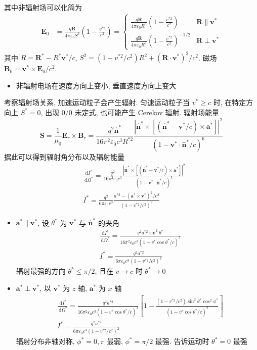\documentclass[12pt,a4paper]{article}%
\numberwithin{equation}{section}%
\renewcommand*{\vec}[1]{\bm{#1}}%
\newcommand{\dif}{\,\mathrm d}
\newcommand*{\uvec}[1]{\hat{\vec{#1}}}
\begin{document}
其中非辐射场可以化简为
\begin{align}
    \vec E_0 &= \frac{q\vec R}{4\pi\varepsilon_0 S^3}\left(1-\frac{v^{*2}}{c^2}\right)
     =\begin{cases}
         \frac{q\vec R}{4\pi\varepsilon_0 R^3}\left(1-\frac{v^{*2}}{c^2}\right) & \vec R \parallel \vec v^* \\
         \frac{q\vec R}{4\pi\varepsilon_0 R^3}\left(1-\frac{v^{*2}}{c^2}\right)^{-1/2} & \vec R \perp \vec v^*
     \end{cases}
\end{align}
其中 $R = \vec R^* - R^*\vec v^*/c$, $S^2 = (1-v^{*2}/c^2)R^2 + (\vec R\cdot\vec v^*)^2/c^2$. 磁场 $\vec B_0 = \vec v^* \times \vec E_0/c^2$.
\begin{itemize}
    \item 非辐射电场在速度方向上变小, 垂直速度方向上变大
\end{itemize}

考察辐射场关系, 加速运动粒子会产生辐射. 匀速运动粒子当 $v^*\ge c$ 时, 在特定方向上 $S^* = 0$, 出现 $0/0$ 未定式, 也可能产生 Cerekov 辐射. 辐射场能量
\begin{equation}
    \vec S = \frac 1{\mu_0}\vec E_r \times\vec B_r 
    = \frac{q^2\uvec n^*}{16\pi^2\varepsilon_0c^3R^{*2}}
    \frac{|\uvec n^*\times[(\uvec n^* - \vec v^*/c)\times\vec a^*]|^2}{(1-\vec v^*\cdot\uvec n^*/c)^6}
\end{equation}
据此可以得到辐射角分布以及辐射能量
\begin{align}
    &\frac{\dif I^*}{\dif\Omega^*} = \frac{q^2}{16\pi^2\varepsilon_0 c^3}\frac{|\uvec n^*\times[(\uvec n^* - \vec v^*/c)\times\vec a^*]|^2}{(1-\vec v^*\cdot\uvec n^*/c)^5} \\
    &I^* = \frac{q^2}{6\pi\varepsilon_0 c^3}\frac{a^{*2} - (\vec a^{*}\times\vec v^{*})^2/c^2}{(1-v^{*2}/c^2)^3}
\end{align}
\begin{itemize}
    \item $\vec a^*\parallel\vec v^*$, 设 $\theta^*$ 为 $\vec v^* $ 与 $\uvec n^*$ 的夹角
    \begin{align}
        &\frac{\dif I^*}{\dif\Omega^*} = \frac{q^2 a^{*2}\sin^2\theta^*}{16\pi^2\varepsilon_0 c^3(1-v^*\cos\theta^*/c)^5} \\
        &I^* = \frac{q^2a^{*2}}{6\pi\varepsilon_0 c^3(1-v^{*2}/c^2)^3}
    \end{align}
    辐射最强的方向 $\theta^* \le \pi/2$, 且在 $v\to c$ 时 $\theta^*\to 0$
    \item $\vec a^*\perp\vec v^*$, 以 $\vec v^*$ 为 $z$ 轴, $\vec a^*$ 为 $x$ 轴
    \begin{align}
        &\frac{\dif I^*}{\dif\Omega^*} = \frac{q^2 a^{*2}}{16\pi^2\varepsilon_0 c^3(1-v^*\cos\theta^*/c)^3}\left[1-
        \frac{(1-v^{*2}/c^2)\sin^2\theta^*\cos^2\phi^*}{(1-v^*\cos\theta^*/c)^2}\right] \\
        &I^* = \frac{q^2a^{*2}}{6\pi\varepsilon_0 c^3(1-v^{*2}/c^2)^2}
    \end{align}
    辐射分布非轴对称, $\phi^* = 0,\pi$ 最弱, $\phi^* = \pi/2$ 最强. 告诉运动时 $\theta^* = 0$ 最强
\end{itemize}
\end{document}
